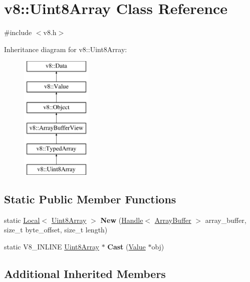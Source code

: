 \hypertarget{classv8_1_1Uint8Array}{\section{v8\-:\-:Uint8\-Array Class Reference}
\label{classv8_1_1Uint8Array}
}


{\ttfamily \#include $<$v8.\-h$>$}

Inheritance diagram for v8\-:\-:Uint8\-Array\-:\begin{figure}[H]
\begin{center}
\leavevmode
\includegraphics[height=6.000000cm]{classv8_1_1Uint8Array}
\end{center}
\end{figure}
\subsection*{Static Public Member Functions}
\begin{DoxyCompactItemize}
\item 
\hypertarget{classv8_1_1Uint8Array_a6033f331f7d059456bf871d3a8e8da44}{static \hyperlink{classv8_1_1Local}{Local}$<$ \hyperlink{classv8_1_1Uint8Array}{Uint8\-Array} $>$ {\bfseries New} (\hyperlink{classv8_1_1Handle}{Handle}$<$ \hyperlink{classv8_1_1ArrayBuffer}{Array\-Buffer} $>$ array\-\_\-buffer, size\-\_\-t byte\-\_\-offset, size\-\_\-t length)}\label{classv8_1_1Uint8Array_a6033f331f7d059456bf871d3a8e8da44}

\item 
\hypertarget{classv8_1_1Uint8Array_a3bf7e458abe0be9bc943ba2de6c4f432}{static V8\-\_\-\-I\-N\-L\-I\-N\-E \hyperlink{classv8_1_1Uint8Array}{Uint8\-Array} $\ast$ {\bfseries Cast} (\hyperlink{classv8_1_1Value}{Value} $\ast$obj)}\label{classv8_1_1Uint8Array_a3bf7e458abe0be9bc943ba2de6c4f432}

\end{DoxyCompactItemize}
\subsection*{Additional Inherited Members}


